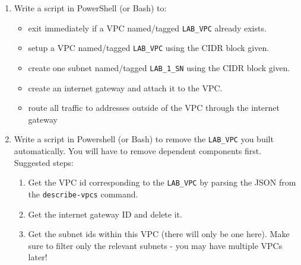 \documentclass{pgnotes}
\begin{document}
\begin{enumerate} 
  
\item
  Write a script in PowerShell (or Bash) to:
  \begin{itemize}
  \item exit immediately if a VPC named/tagged \texttt{LAB\_VPC} already exists.
  \item setup a VPC named/tagged \texttt{LAB\_VPC} using the CIDR block given.
  \item create one subnet named/tagged \texttt{LAB\_1\_SN} using the CIDR block given.
  \item create an internet gateway and attach it to the VPC.
  \item route all traffic to addresses outside of the VPC through the internet gateway
  \end{itemize}

\item
  Write a script in Powershell (or Bash) to remove the \texttt{LAB\_VPC} you built automatically.
  You will have to remove dependent components first.
  Suggested steps:
  \begin{enumerate}
  \item Get the VPC id corresponding to the \texttt{LAB\_VPC} by parsing the JSON from the \texttt{describe-vpcs} command.
  \item Get the internet gateway ID and delete it.    
  \item Get the subnet ids within this VPC (there will only be one here). Make sure to filter only the relevant subnets - you may have multiple VPCs later!
  \end{enumerate}
\end{enumerate}
\end{document}
